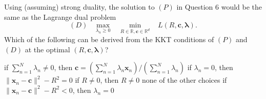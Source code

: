 \documentclass[a4paper,10pt]{exam}
\begin{document}
\begin{questions}
	\question Using (assuming) strong duality, the solution to $(P)$ in Question 6 would be the same as the Lagrange dual problem
	\[(D) \; \; \; \max_{\lambda_n \ge 0} \;\;\; \min_{R \in \mathbb{R}, \mathbf{c} \in \mathbb{R}^d}  \;\;\;  L(R, \mathbf{c}, {\boldsymbol\lambda}).\]
	Which of the following can be derived from the KKT conditions of $(P)$ and $(D)$ at the optimal $(R, \mathbf{c}, {\boldsymbol\lambda})$?
	\begin{choices}
		\CorrectChoice if $\sum_{n=1}^N \lambda_n \neq 0$, then $\mathbf{c} = \left(\sum_{n=1}^N \lambda_n \mathbf{x}_n\right) \Big/ \left(\sum_{n=1}^N \lambda_n\right)$
		\choice if $\lambda_n = 0$, then $\|\mathbf{x}_n - \mathbf{c}\|^2 - R^2 = 0$
		\CorrectChoice if $R \neq 0$, then $R \neq 0$
		\choice none of the other choices
		\choice if $\|\mathbf{x}_n - \mathbf{c}\|^2 - R^2 < 0$, then $\lambda_n = 0$\\
   \end{choices}

\end{questions}
\end{document}
